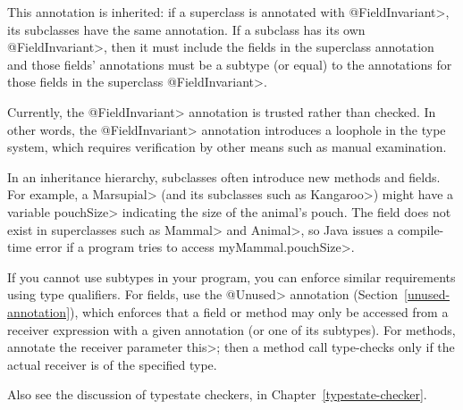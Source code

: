 This annotation is inherited:  if a superclass is annotated with
\<@FieldInvariant>, its subclasses have the same annotation. If a subclass has its
own \<@FieldInvariant>, then it must include the fields in the superclass
annotation and those fields' annotations must be a subtype (or equal) to the
annotations for those fields in the superclass \<@FieldInvariant>.

Currently, the \<@FieldInvariant> annotation is trusted rather than
checked.  In other words, the \<@FieldInvariant> annotation introduces a
loophole in the type system, which requires verification by other means
such as manual examination.



In an inheritance hierarchy, subclasses often introduce new methods and
fields.  For example, a \<Marsupial> (and its subclasses such as
\<Kangaroo>) might have a variable \<pouchSize> indicating the size of the animal's
pouch.  The field does not exist in superclasses such as
\<Mammal> and \<Animal>, so Java issues a compile-time
error if a program tries to access \<myMammal.pouchSize>.

If you cannot use subtypes in your program, you can enforce similar
requirements using type qualifiers.
For fields, use the \<@Unused> annotation (Section~\ref{unused-annotation}), which enforces that a field or method may only
be accessed from a receiver expression with a given annotation (or one of
its subtypes).
For methods, annotate the receiver parameter \<this>; then a method call
type-checks only if the actual receiver is of the specified type.




Also see the discussion of typestate checkers, in
Chapter~\ref{typestate-checker}.



